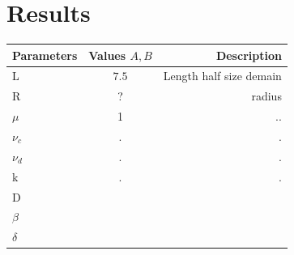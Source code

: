 \section{Results}

	\begin{center}
	\begin{tabular}{ l | c | r }
		\hline
		Parameters & Values $A, B$ & Description \\ \hline
		L & $7.5$ & Length half size demain  \\ 
		R & ? &  radius \\
	
		$\mu$ & 1  & ..\\
		$\nu_c$  & .&  . \\
		$\nu_d$  & .&  . \\
		k & . & .\\
		D & & \\
		$\beta$ & & \\
		$\delta$ & & \\
		\hline
	\end{tabular}
\end{center}	




%	



